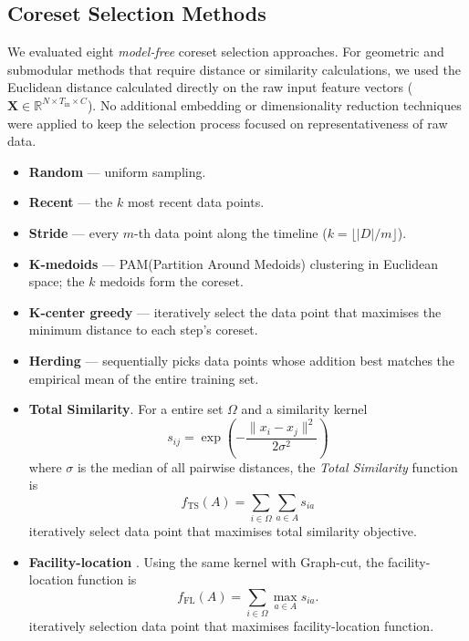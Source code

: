 \subsection{Coreset Selection Methods}\label{sec:coreset_methods}
We evaluated eight \textit{model-free} coreset selection approaches. For geometric and submodular methods that require distance or similarity calculations, we used the Euclidean distance calculated directly on the raw input feature vectors ($\mathbf X\!\in\!\mathbb{R}^{N \times T_{\text{in}}\times C}$). No additional embedding or dimensionality reduction techniques were applied to keep the selection process focused on representativeness of raw data.


\begin{itemize}
    \item \textbf{Random} — uniform sampling.
    \item \textbf{Recent} — the $k$ most recent data points.
    \item \textbf{Stride} — every $m$-th data point along the timeline ($k\!=\!\lfloor\!|D|/m\rfloor$).
    \item \textbf{K-medoids} \cite{kaufmann_clustering_1987} — PAM(Partition Around Medoids) clustering in Euclidean space; the $k$ medoids form the coreset.
    \item \textbf{K-center greedy} \cite{sener_active_2018} — iteratively select the data point that maximises the minimum distance to each step's coreset.
    \item \textbf{Herding} \cite{welling_herding_2009} — sequentially picks data points whose addition best matches the empirical mean of the entire training set.
  \item \textbf{Total Similarity}.  
        For a entire set $\Omega$ and a similarity kernel 
       \[
s_{ij} = \exp\!\left(-\frac{\lVert x_i - x_j \rVert^{2}}{2\sigma^{2}}\right)
\] where $\sigma$ is the median of all pairwise distances,
        the \emph{Total Similarity} function is  
        \[
            f_{\mathrm{TS}}(A)=
            \sum_{i\in\Omega}\sum_{a\in A}s_{ia}
        \]
        iteratively select data point that maximises total similarity objective.

  \item \textbf{Facility-location} \cite{iyer_submodular_2021}.  
        Using the same kernel with Graph-cut, the facility-location function is  
        \[
            f_{\mathrm{FL}}(A)=
            \sum_{i\in\Omega}\max_{a\in A} s_{ia}.
        \]
        iteratively selection data point that maximises facility-location function.
\end{itemize}


